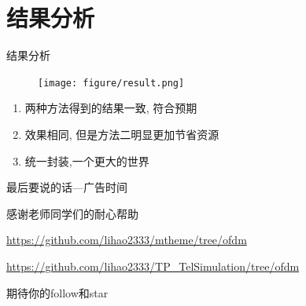 \documentclass[UTF8]{ctexbeamer}
\begin{document}
  \section{结果分析}
  \begin{frame}{结果分析}
	\begin{figure}
	  \texttt{[image: figure/result.png]}
	\end{figure}
	\begin{enumerate}
	  \item 两种方法得到的结果一致, 符合预期
	  \item	效果相同, 但是方法二明显更加节省资源
	  \item 统一封装,一个更大的世界
	\end{enumerate}
  \end{frame}
  \begin{frame}{最后要说的话---广告时间}
	\begin{itemsize}
	  \item 感谢老师同学们的耐心帮助
	  \item	\url{https://github.com/lihao2333/mtheme/tree/ofdm}
	  \item	\url{https://github.com/lihao2333/TP_TelSimulation/tree/ofdm}
	  \item 期待你的follow和star
	\end{itemsize}

  \end{frame}
\end{document}
